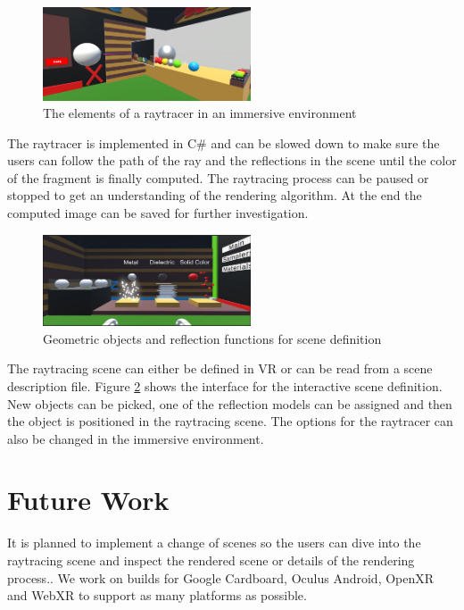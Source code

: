 \documentclass{VRARWorkshop}
\begin{document}
\begin{figure}[h!]
    \begin{center}
        \includegraphics[width=0.55\textwidth]{duringProcess}
        \caption{\label{vray:scene} The elements of a raytracer in an immersive environment}
    \end{center}
\end{figure}
The raytracer is implemented in C\# and can be slowed down to make sure the users can follow the path
of the ray and the reflections in the scene until the color of the fragment is finally computed.
The raytracing process can be paused or stopped to get an understanding of the rendering algorithm.
At the end the computed image can be saved for further investigation.

\begin{figure}[h!]
    \begin{center}
        \includegraphics[width=0.55\textwidth]{sphereCreating}
        \caption{\label{vray:materials} Geometric objects and reflection functions for scene definition}
    \end{center}
\end{figure}
The raytracing scene can either be defined in VR or can be read from a scene description file.
Figure \ref{vray:materials} shows the interface for the interactive scene definition.
New objects can be picked, one of the reflection models can be assigned and then the object
is positioned in the raytracing scene.
The options for the raytracer can also be changed in the immersive environment.
%
\section{Future Work}
It is planned to implement a change of scenes so the users can dive into the raytracing scene
and inspect the rendered scene or details of the rendering process..
We work on builds for Google Cardboard, Oculus Android,
OpenXR and WebXR to support as many platforms as possible.
\end{document}
